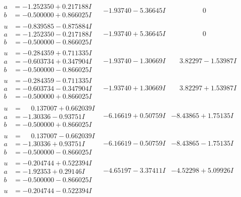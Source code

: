 \documentclass[1p]{elsarticle_modified}
\theoremstyle{definition}
\begin{document}
$$\begin{array}{c|c|c}
\begin{aligned}
a &= -1.252350 + 0.217188 I \\
b &= -0.500000 + 0.866025 I\end{aligned}
 & -1.93740 - 5.36645 I & \phantom{-0.000000 } 0 \\ \hline\begin{aligned}
u &= -0.839585 - 0.875884 I \\
a &= -1.252350 - 0.217188 I \\
b &= -0.500000 - 0.866025 I\end{aligned}
 & -1.93740 + 5.36645 I & \phantom{-0.000000 } 0 \\ \hline\begin{aligned}
u &= -0.284359 + 0.711335 I \\
a &= -0.603734 + 0.347904 I \\
b &= -0.500000 - 0.866025 I\end{aligned}
 & -1.93740 - 1.30669 I & \phantom{-}3.82297 - 1.53987 I \\ \hline\begin{aligned}
u &= -0.284359 - 0.711335 I \\
a &= -0.603734 - 0.347904 I \\
b &= -0.500000 + 0.866025 I\end{aligned}
 & -1.93740 + 1.30669 I & \phantom{-}3.82297 + 1.53987 I \\ \hline\begin{aligned}
u &= \phantom{-}0.137007 + 0.662039 I \\
a &= -1.30336 - 0.93751 I \\
b &= -0.500000 + 0.866025 I\end{aligned}
 & -6.16619 + 0.50759 I & -8.43865 + 1.75135 I \\ \hline\begin{aligned}
u &= \phantom{-}0.137007 - 0.662039 I \\
a &= -1.30336 + 0.93751 I \\
b &= -0.500000 - 0.866025 I\end{aligned}
 & -6.16619 - 0.50759 I & -8.43865 - 1.75135 I \\ \hline\begin{aligned}
u &= -0.204744 + 0.522394 I \\
a &= -1.92353 + 0.29146 I \\
b &= -0.500000 - 0.866025 I\end{aligned}
 & -4.65197 - 3.37411 I & -4.52298 + 5.09926 I \\ \hline\begin{aligned}
u &= -0.204744 - 0.522394 I \\

\end{aligned}
\end{array}$$
\end{document}
